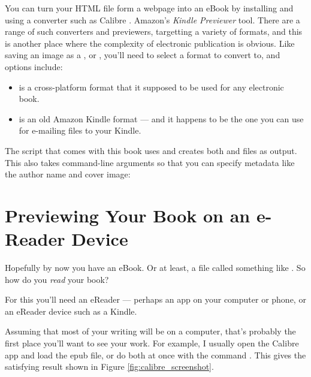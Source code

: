 You can turn your HTML file form a webpage into an eBook by installing
and using a converter such as Calibre .
Amazon's {\em Kindle Previewer} tool.
There are a range of such converters and previewers, targetting a
variety of formats, and this is another place where the complexity of
electronic publication is obvious. Like saving an image as a
,  or , you'll need to select a
format to convert to, and options include:

\begin{itemize}
  \item {} is a cross-platform format that it supposed to
    be used for any electronic book.
  \item {} is an old Amazon Kindle format --- and it
    happens to be the one you can use for e-mailing files to your Kindle.
\end{itemize}

The  script that comes with this book uses
 and creates both  and
 files as output. This also takes command-line
arguments so that you can specify metadata like the author name
and cover image:

{\flushleft \quad {}}

\section{Previewing Your Book on an e-Reader Device}

Hopefully by now you have an eBook. Or at least, a file called something like
. So how do you {\em read} your book?

For this you'll need an eReader --- perhaps an app on your computer or phone,
or an eReader device such as a Kindle.

Assuming that most of your writing will be on a computer, that's
probably the first place you'll want to see your work. For example, I
usually open the Calibre app and load the epub file, or do both at
once with the command . This gives 
the satisfying result shown in Figure \ref{fig:calibre_screenshot}.

